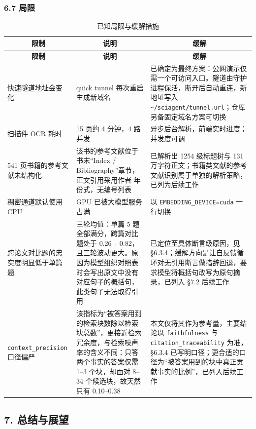 \documentclass[UTF8,fontset=windows,zihao=5,a4paper]{ctexart}
\begin{document}
\subsubsection*{6.7 局限}
\begin{longtable}{@{}p{}p{}p{}@{}}
\caption{已知局限与缓解措施}\\
\toprule
\multicolumn{1}{c}{\textbf{限制}} & \multicolumn{1}{c}{\textbf{说明}} & \multicolumn{1}{c}{\textbf{缓解}} \\
\midrule
\endfirsthead
\toprule
\multicolumn{1}{c}{\textbf{限制}} & \multicolumn{1}{c}{\textbf{说明}} & \multicolumn{1}{c}{\textbf{缓解}} \\
\midrule
\endhead
\bottomrule
\endfoot
快速隧道地址会变化 & quick tunnel 每次重启生成新域名 & 已确定为最终方案：公网演示仅需一个可访问入口。隧道由守护进程保活，断开后自动重连，新地址写入 \texttt{\textasciitilde{}/sciagent/tunnel.url}；仓库另备固定域名方案可切换 \\
扫描件 OCR 耗时 & 15 页约 4 分钟，4 路并发 & 异步后台解析，前端实时进度；并发度可调 \\
541 页书籍的参考文献未结构化 & 该书的参考文献位于书末“Index / Bibliography”章节，正文引用采用作者-年份式，无编号列表 & 已解析出 1254 级标题树与 131 万字符正文；书籍类文献的参考文献识别属于单独的解析策略，已列为后续工作 \\
稠密通道默认使用 CPU & GPU 已被大模型服务占满 & 以 \texttt{EMBEDDING\_\allowbreak{}DEVICE=cuda} 一行切换 \\
跨论文对比题的忠实度明显低于单篇题 & 三轮均值：单篇 5 题全部满分，跨篇对比题处于 0.26 – 0.82，且三轮波动更大。原因为模型组织对照表时会写出原文中没有对应句子的概括句，此类句子无法取得引用 & 已定位至具体断言级原因，见 §6.3.4；缓解方向是让自反馈循环对无引用断言做措辞回退，要求模型将概括句改写为原句摘录，已列入 §7.2 后续工作 \\
\texttt{context\_\allowbreak{}precision} 口径偏严 & 该指标为“被答案用到的检索块数除以检索块总数”，更接近检索冗余度，与检索噪声率的含义不同：只答两个事实的答案仅需 1–3 个块，却面对 8–34 个候选块，故天然只有 0.10–0.38 & 本文仅将其作为参考量，主要结论以 \texttt{faithfulness} 与 \texttt{citation\_\allowbreak{}traceability} 为准，§6.3.4 已写明口径；更合适的口径为“被答案用到的块中真正贡献事实的比例”，已列入后续工作 \\
\end{longtable}

\subsection*{7. 总结与展望}
\end{document}

